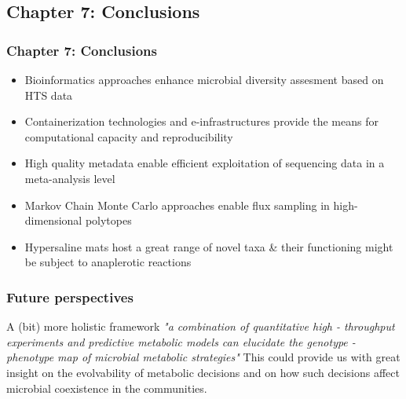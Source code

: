 \documentclass{beamer}
\begin{document}
   \begin{darkframes}
      \section{
         \textbf{\textbf{Chapter 7: } Conclusions}
      }

   \begin{frame}
      \frametitle{\textbf{Chapter 7: } Conclusions}
      \small 
      \begin{itemize}
      
         \item Bioinformatics approaches enhance microbial diversity assesment based on HTS data
         \bigskip
         \item Containerization technologies and e-infrastructures provide the means for computational capacity and reproducibility
         \bigskip
         \item High quality metadata enable efficient exploitation of sequencing data in a meta-analysis level
         \bigskip
         \item Markov Chain Monte Carlo approaches enable flux sampling in high-dimensional polytopes 
         \bigskip
         \item Hypersaline mats host a great range of novel taxa \& their functioning might be subject to anaplerotic reactions

         
      \end{itemize}
   \end{frame}

   \begin{frame}
      \frametitle{Future perspectives}

      \begin{block}{A (bit) more holistic framework}
         \small
         \textit{
            "a combination of quantitative high - throughput experiments and predictive metabolic
            models can elucidate the genotype - phenotype map of microbial metabolic strategies"
         }
         \bigskip
         This could provide us with great insight on the evolvability of metabolic decisions and on how such 
         decisions affect microbial coexistence in the communities. 
         
      \end{block}

   \end{frame}
   \end{darkframes}
\end{document}
